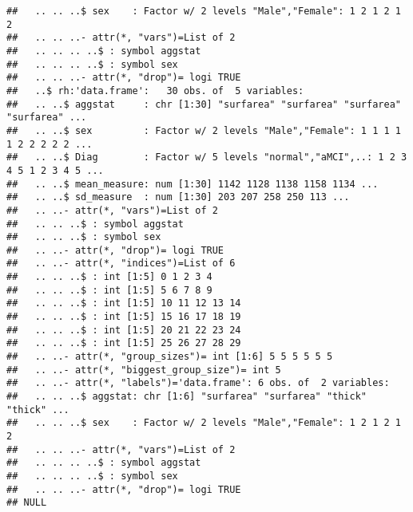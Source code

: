 \documentclass[12pt]{article}\usepackage[]{graphicx}\usepackage[]{color}
\makeatletter
\newenvironment{kframe}{%
 \def\at@end@of@kframe{}%
 \ifinner\ifhmode%
  \def\at@end@of@kframe{\end{minipage}}%
  \begin{minipage}{\columnwidth}%
 \fi\fi%
 \def\FrameCommand##1{\hskip\@totalleftmargin \hskip-\fboxsep
 \colorbox{shadecolor}{##1}\hskip-\fboxsep
     \hskip-\linewidth \hskip-\@totalleftmargin \hskip\columnwidth}%
 \MakeFramed {\advance\hsize-\width
   \@totalleftmargin\z@ \linewidth\hsize
   \@setminipage}}%
 {\par\unskip\endMakeFramed%
 \at@end@of@kframe}
\newenvironment{knitrout}{}{} %
\makeatother
\begin{document}
\begin{knitrout}
\begin{kframe}
\begin{verbatim}
##   .. .. ..$ sex    : Factor w/ 2 levels "Male","Female": 1 2 1 2 1 2
##   .. .. ..- attr(*, "vars")=List of 2
##   .. .. .. ..$ : symbol aggstat
##   .. .. .. ..$ : symbol sex
##   .. .. ..- attr(*, "drop")= logi TRUE
##   ..$ rh:'data.frame':	30 obs. of  5 variables:
##   .. ..$ aggstat     : chr [1:30] "surfarea" "surfarea" "surfarea" "surfarea" ...
##   .. ..$ sex         : Factor w/ 2 levels "Male","Female": 1 1 1 1 1 2 2 2 2 2 ...
##   .. ..$ Diag        : Factor w/ 5 levels "normal","aMCI",..: 1 2 3 4 5 1 2 3 4 5 ...
##   .. ..$ mean_measure: num [1:30] 1142 1128 1138 1158 1134 ...
##   .. ..$ sd_measure  : num [1:30] 203 207 258 250 113 ...
##   .. ..- attr(*, "vars")=List of 2
##   .. .. ..$ : symbol aggstat
##   .. .. ..$ : symbol sex
##   .. ..- attr(*, "drop")= logi TRUE
##   .. ..- attr(*, "indices")=List of 6
##   .. .. ..$ : int [1:5] 0 1 2 3 4
##   .. .. ..$ : int [1:5] 5 6 7 8 9
##   .. .. ..$ : int [1:5] 10 11 12 13 14
##   .. .. ..$ : int [1:5] 15 16 17 18 19
##   .. .. ..$ : int [1:5] 20 21 22 23 24
##   .. .. ..$ : int [1:5] 25 26 27 28 29
##   .. ..- attr(*, "group_sizes")= int [1:6] 5 5 5 5 5 5
##   .. ..- attr(*, "biggest_group_size")= int 5
##   .. ..- attr(*, "labels")='data.frame':	6 obs. of  2 variables:
##   .. .. ..$ aggstat: chr [1:6] "surfarea" "surfarea" "thick" "thick" ...
##   .. .. ..$ sex    : Factor w/ 2 levels "Male","Female": 1 2 1 2 1 2
##   .. .. ..- attr(*, "vars")=List of 2
##   .. .. .. ..$ : symbol aggstat
##   .. .. .. ..$ : symbol sex
##   .. .. ..- attr(*, "drop")= logi TRUE
## NULL
\end{verbatim}
\end{kframe}
\end{knitrout}







% 


\end{document}
